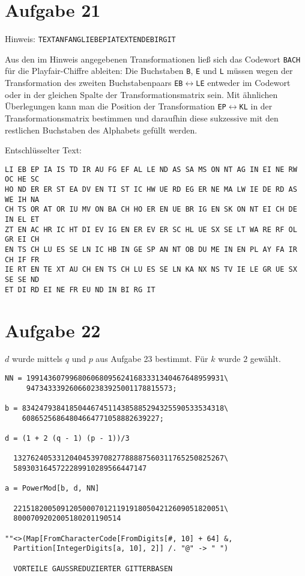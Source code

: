 \section*{Aufgabe 21}
Hinweis: \verb/TEXTANFANGLIEBEPIATEXTENDEBIRGIT/

Aus den im Hinweis angegebenen Transformationen ließ sich das Codewort
\verb/BACH/ für die Playfair-Chiffre ableiten: Die Buchstaben \verb/B/,
\verb/E/ und \verb/L/ müssen wegen der Transformation des zweiten
Buchstabenpaars \verb/EB/$\leftrightarrow$\verb/LE/  entweder im Codewort oder
in der gleichen Spalte der Transformationsmatrix sein. Mit ähnlichen
Überlegungen kann man die Position der Transformation
\verb/EP/$\leftrightarrow$\verb/KL/ in der Transformationsmatrix bestimmen und
daraufhin diese sukzessive mit den restlichen Buchstaben des Alphabets gefüllt
werden.

Entschlüsselter Text:
\begin{verbatim}
LI EB EP IA IS TD IR AU FG EF AL LE ND AS SA MS ON NT AG IN EI NE RW OC HE SC
HO ND ER ER ST EA DV EN TI ST IC HW UE RD EG ER NE MA LW IE DE RD AS WE IH NA
CH TS OR AT OR IU MV ON BA CH HO ER EN UE BR IG EN SK ON NT EI CH DE IN EL ET
ZT EN AC HR IC HT DI EV IG EN ER EV ER SC HL UE SX SE LT WA RE RF OL GR EI CH
EN TS CH LU ES SE LN IC HB IN GE SP AN NT OB DU ME IN EN PL AY FA IR CH IF FR
IE RT EN TE XT AU CH EN TS CH LU ES SE LN KA NX NS TV IE LE GR UE SX SE SE ND
ET DI RD EI NE FR EU ND IN BI RG IT 
\end{verbatim}

\section*{Aufgabe 22}
$d$ wurde mittels $q$ und $p$ aus Aufgabe 23 bestimmt. Für $k$ wurde $2$
gewählt.
\lstset{language=Mathematica}
\begin{lstlisting}
NN = 1991436079968060680956241683331340467648959931\
     9473433392606602383925001178815573;

b = 83424793841850446745114385885294325590533534318\
    60865256864804664771058882639227;

d = (1 + 2 (q - 1) (p - 1))/3

  1327624053312040453970827788887560311765250825267\ 
  5893031645722289910289566447147

a = PowerMod[b, d, NN]

  2215182005091205000701211919180504212609051820051\
  8000709202005180201190514

""<>(Map[FromCharacterCode[FromDigits[#, 10] + 64] &,
  Partition[IntegerDigits[a, 10], 2]] /. "@" -> " ")

  VORTEILE GAUSSREDUZIERTER GITTERBASEN
\end{lstlisting}

